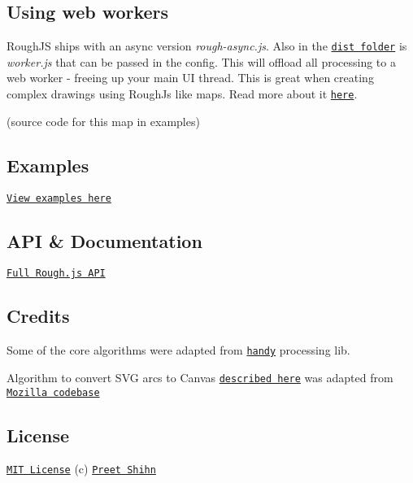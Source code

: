  

\subsection*{Using web workers}

Rough\+JS ships with an async version {\itshape rough-\/async.\+js}. Also in the \href{https://github.com/pshihn/rough/tree/master/dist}{\tt dist folder} is {\itshape worker.\+js} that can be passed in the config. This will offload all processing to a web worker -\/ freeing up your main UI thread. This is great when creating complex drawings using Rough\+Js like maps. Read more about it \href{https://github.com/pshihn/rough/wiki/RoughJS-in-a-web-worker}{\tt here}.



(source code for this map in examples)

\subsection*{Examples}

\href{https://github.com/pshihn/rough/wiki/Examples}{\tt View examples here}

\subsection*{A\+PI \& Documentation}

\href{https://github.com/pshihn/rough/wiki}{\tt Full Rough.\+js A\+PI}

\subsection*{Credits}

Some of the core algorithms were adapted from \href{https://www.gicentre.net/software/#/handy/}{\tt handy} processing lib.

Algorithm to convert S\+VG arcs to Canvas \href{https://www.w3.org/TR/SVG/implnote.html}{\tt described here} was adapted from \href{https://hg.mozilla.org/mozilla-central/file/17156fbebbc8/content/svg/content/src/nsSVGPathDataParser.cpp#l887}{\tt Mozilla codebase}

\subsection*{License}

\href{https://github.com/pshihn/rough/blob/master/LICENSE}{\tt M\+IT License} (c) \href{https://twitter.com/preetster}{\tt Preet Shihn} 